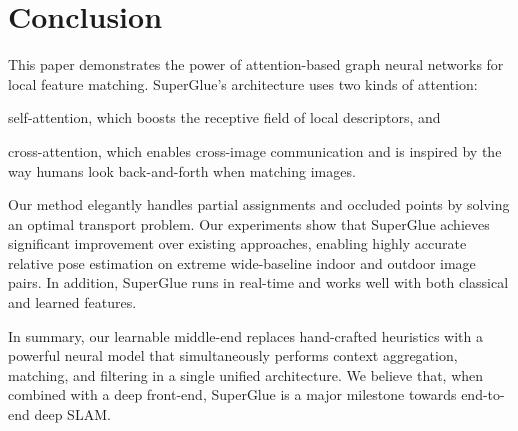 \documentclass[10pt,twocolumn,letterpaper]{article}
\renewcommand{\*}[1]{\mathbf{#1}}
\newcommand{\0}{\phantom{0}}
\begin{document}
\section{Conclusion}
This paper demonstrates the power of attention-based graph neural networks for local feature matching. SuperGlue's architecture uses two kinds of attention:
\begin{enumerate*}[label=(\roman*)]
\item self-attention, which boosts the receptive field of local descriptors, and
\item cross-attention, which enables cross-image communication and is inspired by the way humans look back-and-forth when matching images.
\end{enumerate*}
Our method elegantly handles partial assignments and occluded points by solving an optimal transport problem. Our experiments show that SuperGlue achieves significant improvement over existing approaches, enabling highly accurate relative pose estimation on extreme wide-baseline indoor and outdoor image pairs. In addition, SuperGlue runs in real-time and works well with both classical and learned features.

In summary, our learnable middle-end replaces hand-crafted heuristics with a powerful neural model that simultaneously performs context aggregation, matching, and filtering in a single unified architecture. We believe that, when combined with a deep front-end, SuperGlue is a major milestone towards end-to-end deep SLAM.
\end{document}
